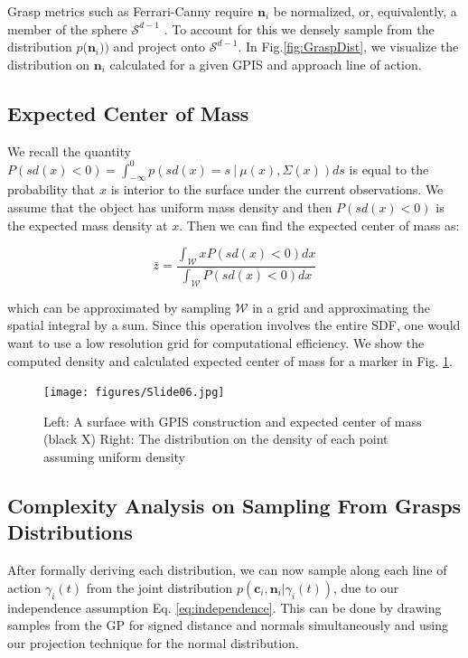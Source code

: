 \documentclass[letterpaper, 10 pt, conference]{ieeeconf}  %
\begin{document}
Grasp metrics such as  Ferrari-Canny require $\textbf{n}_i$ be normalized, or, equivalently, a member of the sphere $\mathcal{S}^{d-1}$ \cite{ferrari1992}. To account for this we densely sample from the  distribution $p \big(\textbf{n}_i ) \big)$  and project onto $\mathcal{S}^{d-1}$.  In Fig.\ref{fig:GraspDist}, we visualize the distribution on $\textbf{n}_i$ calculated for a given GPIS and approach line of action.


\subsection{Expected Center of Mass}\label{sec:mass} 

We recall the quantity $P(sd(x) < 0) = \int_{-\infty}^{0} p(sd(x) =  s \ | \ \mu(x),\Sigma(x)) ds$ is equal to the probability that $x$ is interior to the surface under the current observations.
We assume that the object has uniform mass density and then $P(sd(x) < 0)$ is the expected mass density at $x$.
Then we can find the expected center of mass as:

\begin{equation}
  \bar{z} 
  =
  \frac
    {\int_{\mathcal{W}}x P(sd(x)<0) dx}
    {\int_{\mathcal{W}}  P(sd(x)<0) dx}
\end{equation}

which can be approximated by sampling $\mathcal{W}$ in a grid and approximating the spatial integral by a sum. Since this operation involves the entire SDF, one would want to use a low resolution grid for computational efficiency. We show the computed density and calculated expected center of mass for a marker in Fig. \ref{fig:GPIS_MASS}.


\begin{figure}[ht!]
\centering
\texttt{[image: figures/Slide06.jpg]}
\caption{ \footnotesize Left: A surface with GPIS construction and expected center of mass (black X)
Right: The distribution on the density of each point assuming uniform density}
\vspace*{-10pt}
\label{fig:GPIS_MASS}
\end{figure}

\subsection{Complexity Analysis on Sampling From Grasps Distributions}

After formally deriving each distribution,  we can now sample along each line of action $\gamma_i(t)$ from the joint distribution $p(\textbf{c}_i,\textbf{n}_i | \gamma_i(t))$, due to our independence assumption Eq. \ref{eq:independence}. This can be done by drawing samples from the GP for signed distance and normals simultaneously and using our projection technique for the normal distribution. 
\end{document}

